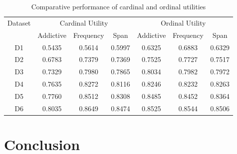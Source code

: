 \documentclass[sigconf]{acmart}
\begin{document}
\begin{table}[ht]
\caption{Comparative performance of cardinal and ordinal utilities}
\label{tab:utility}
\begin{tabular}{|c|c|c|c|c|c|c|}
\hline
{Dataset} & \multicolumn{3}{|c|}{Cardinal Utility} & \multicolumn{3}{|c|}{Ordinal Utility} \\
 &  Addictive & Frequency & Span & Addictive  & Frequency &Span \\\hline
D1 & 0.5435	& 0.5614	& 0.5997	& 0.6325	& 0.6883	& 0.6329\\\hline
D2 & 0.6783& 	0.7379	& 0.7369	& 0.7525	& 0.7727	& 0.7517\\\hline
D3 & 0.7329& 	0.7980& 	0.7865& 	0.8034& 	0.7982& 	0.7972\\\hline
D4 & 0.7635	& 0.8272& 	0.8116& 	0.8246& 	0.8232	& 0.8263\\\hline
D5 & 0.7760& 	0.8512& 	0.8308& 	0.8485	& 0.8452& 	0.8364\\\hline
D6 & 0.8035& 	0.8649	& 0.8474	& 0.8525	& 0.8544& 	0.8506
\\ \hline \end{tabular}
\end{table}


\section{Conclusion}\label{sec:conclusion}




\end{document}
